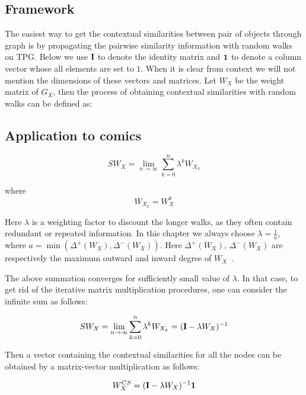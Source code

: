 \subsection{Framework}
\label{ssec:pg:rw}
The easiest way to get the contextual similarities between pair of objects through graph is by propagating the pairwise similarity information with random walks on TPG. Below we use $\mathbf{I}$ to denote the identity matrix and $\mathbf{1}$ to denote a column vector whose all elements are set to $1$. When it is clear from context we will not mention the dimensions of these vectors and matrices. Let $W_X$ be the weight matrix of $G_X$, then the process of obtaining contextual similarities with random walks can be defined as:

\subsection{Application to comics} %
\label{sub:application_to_comics}


\begin{equation}
SW_X=\lim_{n\rightarrow \infty}\sum_{k=0}^n \lambda^k W_{X_k}
\label{eqn:pg:rw1}
\end{equation}

where
\begin{equation}
W_{X_k} = W_X^k
\end{equation}

Here $\lambda$ is a weighting factor to discount the longer walks, as they often contain redundant or repeated information. In this chapter we always choose $\lambda=\frac{1}{a}$, where $a=\min(\Delta^+(W_X),\Delta^-(W_X))$. Here $\Delta^+(W_X)$, $\Delta^-(W_X)$ are respectively the maximum outward and inward degree of $W_X$~\cite{Gartner2003a}.

The above summation converges for sufficiently small value of $\lambda$. In that case, to get rid of the iterative matrix multiplication procedures, one can consider the infinite sum as follows:

\begin{equation}
SW_X=\lim_{n\rightarrow \infty}\sum_{k=0}^n \lambda^k W_{X_k}=(\mathbf{I}-\lambda W_X)^{-1}
\end{equation}

Then a vector containing the contextual similarities for all the nodes can be obtained by a matrix-vector multiplication as follows:

\begin{equation}
W^{CS}_X = (\mathbf{I}-\lambda W_X)^{-1}\mathbf{1}
\label{eqn:pg:rw2}
\end{equation}

